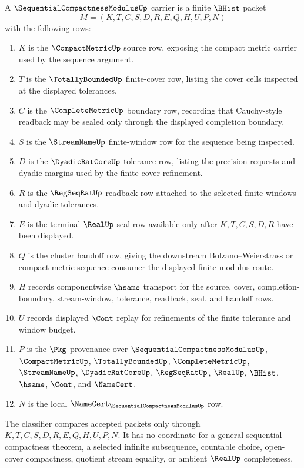 \begin{definition}
\label{def:sequential-compactness-modulus-carrier}
A $\SequentialCompactnessModulusUp$ carrier is a finite $\BHist$ packet
$$
M=(K,T,C,S,D,R,E,Q,H,U,P,N)
$$
with the following rows:
\begin{enumerate}
\item $K$ is the $\CompactMetricUp$ source row, exposing the compact metric carrier used by the sequence argument.
\item $T$ is the $\TotallyBoundedUp$ finite-cover row, listing the cover cells inspected at the displayed tolerances.
\item $C$ is the $\CompleteMetricUp$ boundary row, recording that Cauchy-style readback may be sealed only through the displayed completion boundary.
\item $S$ is the $\StreamNameUp$ finite-window row for the sequence being inspected.
\item $D$ is the $\DyadicRatCoreUp$ tolerance row, listing the precision requests and dyadic margins used by the finite cover refinement.
\item $R$ is the $\RegSeqRatUp$ readback row attached to the selected finite windows and dyadic tolerances.
\item $E$ is the terminal $\RealUp$ seal row available only after $K,T,C,S,D,R$ have been displayed.
\item $Q$ is the cluster handoff row, giving the downstream Bolzano--Weierstrass or compact-metric sequence consumer the displayed finite modulus route.
\item $H$ records componentwise $\hsame$ transport for the source, cover, completion-boundary, stream-window, tolerance, readback, seal, and handoff rows.
\item $U$ records displayed $\Cont$ replay for refinements of the finite tolerance and window budget.
\item $P$ is the $\Pkg$ provenance over $\SequentialCompactnessModulusUp$, $\CompactMetricUp$, $\TotallyBoundedUp$, $\CompleteMetricUp$, $\StreamNameUp$, $\DyadicRatCoreUp$, $\RegSeqRatUp$, $\RealUp$, $\BHist$, $\hsame$, $\Cont$, and $\NameCert$.
\item $N$ is the local $\NameCert_{\SequentialCompactnessModulusUp}$ row.
\end{enumerate}
The classifier compares accepted packets only through $K,T,C,S,D,R,E,Q,H,U,P,N$. It has no coordinate for a general sequential compactness theorem, a selected infinite subsequence, countable choice, open-cover compactness, quotient stream equality, or ambient $\RealUp$ completeness.
\end{definition}


